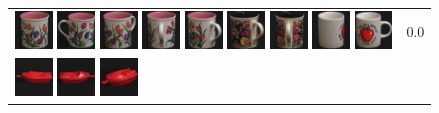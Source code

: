 \begin{figure}[!bp]
\begin{tabular}{m{11cm} | m{3cm} |}
\includegraphics[width=1cm]{coil/beeld-8.eps}
\includegraphics[width=1cm]{coil/beeld-7.eps}
\includegraphics[width=1cm]{coil/beeld-9.eps}
\includegraphics[width=1cm]{coil/beeld-11.eps}
\includegraphics[width=1cm]{coil/beeld-10.eps}
\includegraphics[width=1cm]{coil/beeld-64.eps}
\includegraphics[width=1cm]{coil/beeld-65.eps}
\includegraphics[width=1cm]{coil/beeld-38.eps}
\includegraphics[width=1cm]{coil/beeld-36.eps}
& {\scriptsize 0.0}
\\
\includegraphics[width=1cm]{coil/beeld-18.eps}
\includegraphics[width=1cm]{coil/beeld-19.eps}
\includegraphics[width=1cm]{coil/beeld-21.eps}

\end{tabular}
\end{figure}

